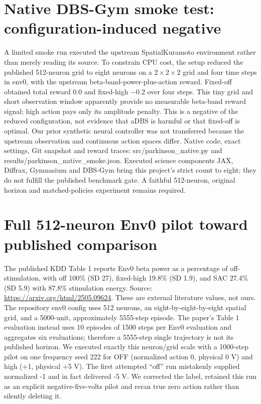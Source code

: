 \section{Native DBS-Gym smoke test: configuration-induced negative}
A limited smoke run executed the upstream SpatialKuramoto environment rather than merely reading its source. To constrain CPU cost, the setup reduced the published 512-neuron grid to eight neurons on a $2\times2\times2$ grid and four time steps in env0, with the upstream beta-band-power-plus-action reward. Fixed-off obtained total reward 0.0 and fixed-high $-0.2$ over four steps. This tiny grid and short observation window apparently provide no measurable beta-band reward signal; high action pays only its amplitude penalty. This is a negative of the reduced configuration, not evidence that aDBS is harmful or that fixed-off is optimal. Our prior synthetic neural controller was not transferred because the upstream observation and continuous action spaces differ. Native code, exact settings, Git snapshot and reward traces: src/parkinson\_native.py and results/parkinson\_native\_smoke.json. Executed science components JAX, Diffrax, Gymnasium and DBS-Gym bring this project's strict count to eight; they do not fulfill the published benchmark gate. A faithful 512-neuron, original horizon and matched-policies experiment remains required.

\section{Full 512-neuron Env0 pilot toward published comparison}
The published KDD Table 1 reports Env0 beta power as a percentage of off-stimulation, with off 100\% (SD 27), fixed-high 19.8\% (SD 1.9), and SAC 27.4\% (SD 5.9) with 87.8\% stimulation energy. Source: \url{https://arxiv.org/html/2505.09624}. These are external literature values, not ours. The repository env0 config uses 512 neurons, an eight-by-eight-by-eight spatial grid, and a 5000-unit, approximately 5555-step episode. The paper's Table 1 evaluation instead uses 10 episodes of 1500 steps per Env0 evaluation and aggregates six evaluations; therefore a 5555-step single trajectory is not its published horizon. We executed exactly this neuron/grid scale with a 1000-step pilot on one frequency seed 222 for OFF (normalized action 0, physical 0 V) and high (+1, physical +5 V). The first attempted ``off'' run mistakenly supplied normalized -1 and in fact delivered -5 V. We corrected the label, retained this run as an explicit negative-five-volts pilot and reran true zero action rather than silently deleting it.

